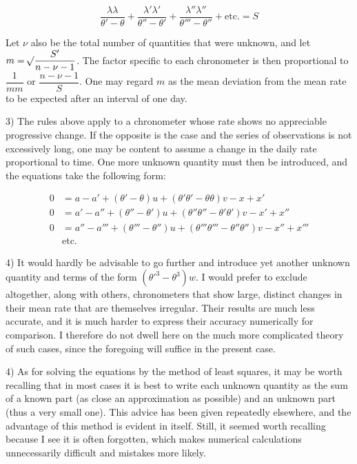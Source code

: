 \[
\frac{\lambda\lambda}{\theta'-\theta} + \frac{\lambda'\lambda'}{\theta''-\theta'} + \frac{\lambda''\lambda''}{\theta'''-\theta''} + \text{etc.} = S
\]

Let $\nu$ also be the total number of quantities that were unknown, and let $m=\mathord{{}^{}\!\surd}\dfrac{S'}{n-\nu-1}$. The factor specific to each chronometer is then proportional to $\dfrac{1}{mm}$ or $\dfrac{n-\nu-1}{S}$. One may regard $m$ as the mean deviation from the mean rate to be expected after an interval of one day.

3) The rules above apply to a chronometer whose rate shows no appreciable progressive change. If the opposite is the case and the series of observations is not excessively long, one may be content to assume a change in the daily rate proportional to time. One more unknown quantity must then be introduced, and the equations take the following form:

\[
\begin{aligned}
0 &= a-a'+(\theta'-\theta)u+(\theta'\theta'-\theta\theta)v-x+x'\\
0 &= a'-a''+(\theta''-\theta')u+(\theta''\theta''-\theta'\theta')v-x'+x''\\
0 &= a''-a'''+(\theta'''-\theta'')u+(\theta'''\theta'''-\theta''\theta'')v-x''+x'''\\
&\text{etc.}
\end{aligned}
\]

4) It would hardly be advisable to go further and introduce yet another unknown quantity and terms of the form $(\theta'^3-\theta^3)w$. I would prefer to exclude altogether, along with others, chronometers that show large, distinct changes in their mean rate that are themselves irregular. Their results are much less accurate, and it is much harder to express their accuracy numerically for comparison. I therefore do not dwell here on the much more complicated theory of such cases, since the foregoing will suffice in the present case.

4) As for solving the equations by the method of least squares, it may be worth recalling that in most cases it is best to write each unknown quantity as the sum of a known part (as close an approximation as possible) and an unknown part (thus a very small one). This advice has been given repeatedly elsewhere, and the advantage of this method is evident in itself. Still, it seemed worth recalling because I see it is often forgotten, which makes numerical calculations unnecessarily difficult and mistakes more likely.

